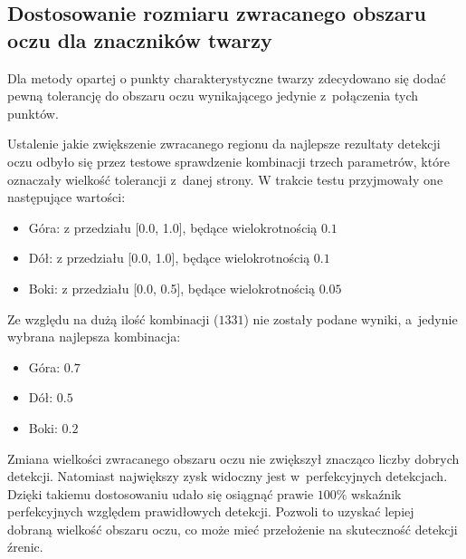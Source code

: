 \subsection{Dostosowanie rozmiaru zwracanego obszaru oczu dla znaczników twarzy} \label{section:facemark_eye_size}

Dla metody opartej o punkty charakterystyczne twarzy zdecydowano się dodać pewną tolerancję do obszaru oczu wynikającego jedynie z~połączenia tych punktów.

\par

Ustalenie jakie zwiększenie zwracanego regionu da najlepsze rezultaty detekcji oczu odbyło się przez testowe sprawdzenie kombinacji trzech parametrów, które oznaczały wielkość tolerancji z~danej strony. W trakcie testu przyjmowały one następujące wartości:

\begin{itemize}
    \item Góra: z przedziału [0.0, 1.0], będące wielokrotnością $0.1$
    \item Dół: z przedziału [0.0, 1.0], będące wielokrotnością $0.1$
    \item Boki: z przedziału [0.0, 0.5], będące wielokrotnością $0.05$
\end{itemize}

\par

Ze względu na dużą ilość kombinacji ($1331$) nie zostały podane wyniki, a~jedynie wybrana najlepsza kombinacja:

\begin{itemize}
    \item Góra: $0.7$
    \item Dół: $0.5$
    \item Boki: $0.2$
\end{itemize}




Zmiana wielkości zwracanego obszaru oczu nie zwiększył znacząco liczby dobrych detekcji. Natomiast największy zysk widoczny jest w~perfekcyjnych detekcjach. Dzięki takiemu dostosowaniu udało się osiągnąć prawie $100\%$ wskaźnik perfekcyjnych względem prawidłowych detekcji. Pozwoli to uzyskać lepiej dobraną wielkość obszaru oczu, co może mieć przełożenie na skuteczność detekcji źrenic.